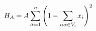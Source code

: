 \documentclass[preview]{standalone}
\begin{document}
\begin{align*}
\special{dvisvgm:raw <g id='unique000'>}H_A = A\sum_{\alpha=1}^{n}\left(1-\sum_{i:\alpha \in V_i} x_i\right)^2\special{dvisvgm:raw </g>}
\end{align*}
\end{document}
